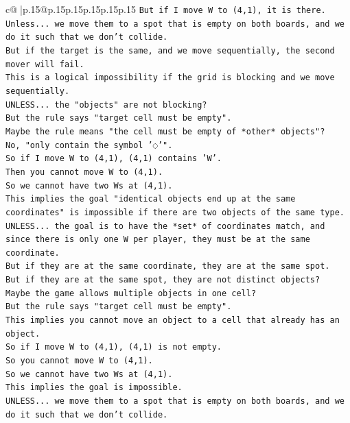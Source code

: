 \documentclass{article}
\begin{document}
{\begin{supertabular}{c@{$\;$}|p{.15\linewidth}@{}p{.15\linewidth}p{.15\linewidth}p{.15\linewidth}p{.15\linewidth}p{.15\linewidth}}
{{{\texttt{But if I move W to (4,1), it is there.} \\
\texttt{Unless... we move them to a spot that is empty on both boards, and we do it such that we don't collide.} \\
\texttt{But if the target is the same, and we move sequentially, the second mover will fail.} \\
\texttt{This is a logical impossibility if the grid is blocking and we move sequentially.} \\
\texttt{UNLESS... the "objects" are not blocking?} \\
\texttt{But the rule says "target cell must be empty".} \\
\texttt{Maybe the rule means "the cell must be empty of *other* objects"?} \\
\texttt{No, "only contain the symbol '◌'".} \\
\texttt{So if I move W to (4,1), (4,1) contains 'W'.} \\
\texttt{Then you cannot move W to (4,1).} \\
\texttt{So we cannot have two Ws at (4,1).} \\
\texttt{This implies the goal "identical objects end up at the same coordinates" is impossible if there are two objects of the same type.} \\
\texttt{UNLESS... the goal is to have the *set* of coordinates match, and since there is only one W per player, they must be at the same coordinate.} \\
\texttt{But if they are at the same coordinate, they are at the same spot.} \\
\texttt{But if they are at the same spot, they are not distinct objects?} \\
\texttt{Maybe the game allows multiple objects in one cell?} \\
\texttt{But the rule says "target cell must be empty".} \\
\texttt{This implies you cannot move an object to a cell that already has an object.} \\
\texttt{So if I move W to (4,1), (4,1) is not empty.} \\
\texttt{So you cannot move W to (4,1).} \\
\texttt{So we cannot have two Ws at (4,1).} \\
\texttt{This implies the goal is impossible.} \\
\texttt{UNLESS... we move them to a spot that is empty on both boards, and we do it such that we don't collide.} \\
}}}
\end{supertabular}}
\end{document}
